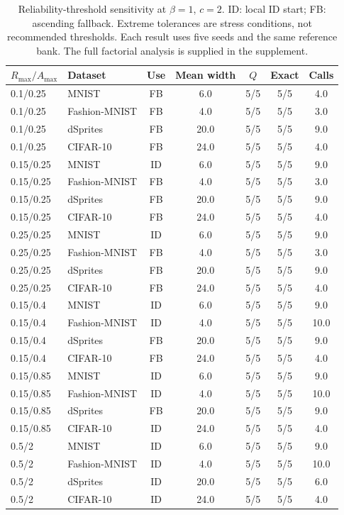 \documentclass[make,article,submit,pdftex,moreauthors]{Definitions/mdpi}
\begin{document}
\begin{table}[H]
\caption{Reliability-threshold sensitivity at $\beta=1$, $c=2$. ID: local ID start; FB: ascending fallback. Extreme tolerances are stress conditions, not recommended thresholds. Each result uses five seeds and the same reference bank. The full factorial analysis is supplied in the supplement.}\label{tab:reliability}
\small
\setlength{\tabcolsep}{3pt}
\begin{tabular*}{\textwidth}{@{\extracolsep{\fill}}llccccc@{}}
\toprule
$R_{\max}/A_{\max}$ & Dataset & Use & Mean width & $Q$ & Exact & Calls \\
\midrule
0.1/0.25 & MNIST & FB & 6.0 & 5/5 & 5/5 & 4.0 \\
0.1/0.25 & Fashion-MNIST & FB & 4.0 & 5/5 & 5/5 & 3.0 \\
0.1/0.25 & dSprites & FB & 20.0 & 5/5 & 5/5 & 9.0 \\
0.1/0.25 & CIFAR-10 & FB & 24.0 & 5/5 & 5/5 & 4.0 \\
0.15/0.25 & MNIST & ID & 6.0 & 5/5 & 5/5 & 9.0 \\
0.15/0.25 & Fashion-MNIST & FB & 4.0 & 5/5 & 5/5 & 3.0 \\
0.15/0.25 & dSprites & FB & 20.0 & 5/5 & 5/5 & 9.0 \\
0.15/0.25 & CIFAR-10 & FB & 24.0 & 5/5 & 5/5 & 4.0 \\
0.25/0.25 & MNIST & ID & 6.0 & 5/5 & 5/5 & 9.0 \\
0.25/0.25 & Fashion-MNIST & FB & 4.0 & 5/5 & 5/5 & 3.0 \\
0.25/0.25 & dSprites & FB & 20.0 & 5/5 & 5/5 & 9.0 \\
0.25/0.25 & CIFAR-10 & FB & 24.0 & 5/5 & 5/5 & 4.0 \\
0.15/0.4 & MNIST & ID & 6.0 & 5/5 & 5/5 & 9.0 \\
0.15/0.4 & Fashion-MNIST & ID & 4.0 & 5/5 & 5/5 & 10.0 \\
0.15/0.4 & dSprites & FB & 20.0 & 5/5 & 5/5 & 9.0 \\
0.15/0.4 & CIFAR-10 & FB & 24.0 & 5/5 & 5/5 & 4.0 \\
0.15/0.85 & MNIST & ID & 6.0 & 5/5 & 5/5 & 9.0 \\
0.15/0.85 & Fashion-MNIST & ID & 4.0 & 5/5 & 5/5 & 10.0 \\
0.15/0.85 & dSprites & FB & 20.0 & 5/5 & 5/5 & 9.0 \\
0.15/0.85 & CIFAR-10 & ID & 24.0 & 5/5 & 5/5 & 4.0 \\
0.5/2 & MNIST & ID & 6.0 & 5/5 & 5/5 & 9.0 \\
0.5/2 & Fashion-MNIST & ID & 4.0 & 5/5 & 5/5 & 10.0 \\
0.5/2 & dSprites & ID & 20.0 & 5/5 & 5/5 & 6.0 \\
0.5/2 & CIFAR-10 & ID & 24.0 & 5/5 & 5/5 & 4.0 \\
\bottomrule\end{tabular*}
\end{table}
\end{document}
